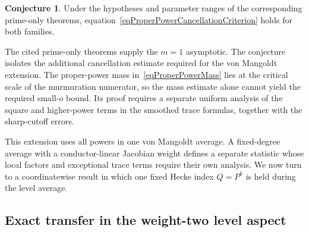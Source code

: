 \documentclass[12pt,reqno]{amsart}
\numberwithin{equation}{section}
\theoremstyle{plain}
\theoremstyle{definition}
\newtheorem{conjecture}[theorem]{Conjecture}
\theoremstyle{remark}
\begin{document}
\begin{conjecture}
Under the hypotheses and parameter ranges of the corresponding prime-only theorems, equation~\eqref{eqProperPowerCancellationCriterion} holds for both families.
\end{conjecture}

The cited prime-only theorems supply the $m=1$ asymptotic.
The conjecture isolates the additional cancellation estimate required for the von Mangoldt extension.
The proper-power mass in~\eqref{eqProperPowerMass} lies at the critical scale of the murmuration numerator, so the mass estimate alone cannot yield the required small-$o$ bound.
Its proof requires a separate uniform analysis of the square and higher-power terms in the smoothed trace formulas, together with the sharp-cutoff errors.

This extension uses all powers in one von Mangoldt average.
A fixed-degree average with a conductor-linear Jacobian weight defines a separate statistic whose local factors and exceptional trace terms require their own analysis.
We now turn to a coordinatewise result in which one fixed Hecke index $Q=P^k$ is held during the level average.

\subsection{Exact transfer in the weight-two level aspect}
\end{document}
